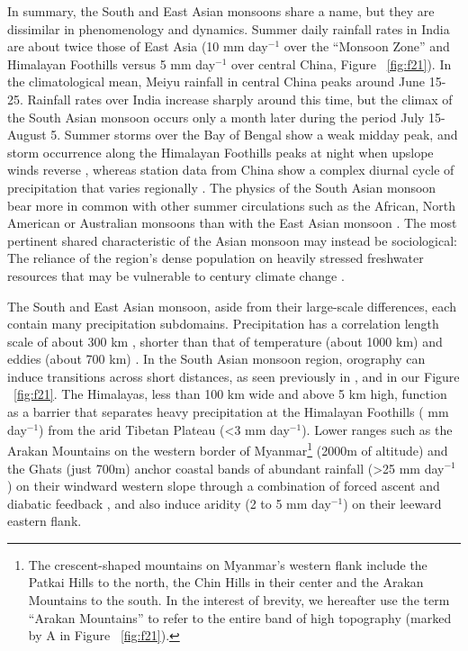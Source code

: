 	In summary, the South and East Asian monsoons share a name, but they are dissimilar in phenomenology and dynamics. Summer daily rainfall rates in India are about twice those of East Asia (10 mm day$^{-1}$ over the ``Monsoon Zone'' and Himalayan Foothills versus 5 mm day$^{-1}$ over central China, Figure ~\ref{fig:f21}). In the climatological mean, Meiyu rainfall in central China peaks around June 15-25. Rainfall rates over India increase sharply around this time, but the climax of the South Asian monsoon occurs only a month later during the period July 15-August 5. Summer storms over the Bay of Bengal show a weak midday peak, and storm occurrence along the Himalayan Foothills peaks at night when upslope winds reverse \citep{Romatschke2011a}, whereas station data from China show a complex diurnal cycle of precipitation that varies regionally \citep{Zhou2008}. The physics of the South Asian monsoon bear more in common with other summer circulations such as the African, North American or Australian monsoons than with the East Asian monsoon \citep{Rodwell2001}. The most pertinent shared characteristic of the Asian monsoon may instead be sociological: The reliance of the region's dense population on heavily stressed freshwater resources that may be vulnerable to  century climate change \citep{Gleeson2012,JimenezCisneros2014}. 
		
	The South and East Asian monsoon, aside from their large-scale differences, each contain many precipitation subdomains. Precipitation has a correlation length scale of about 300 km \citep{Dai1997}, shorter than that of temperature (about 1000 km) and eddies (about 700 km) \citep{Hansen1987,Barnes2012}. In the South Asian monsoon region, orography can induce transitions across short distances, as seen previously in \cite{Xie2006}, \cite{Biasutti2011} and in our Figure ~\ref{fig:f21}. The Himalayas, less than 100 km wide and above 5 km high, function as a barrier that separates heavy precipitation at the Himalayan Foothills ( mm day$^{-1}$) from the arid Tibetan Plateau (\textless 3 mm day$^{-1}$). Lower ranges such as the Arakan Mountains on the western border of Myanmar\footnote{The crescent-shaped mountains on Myanmar's western flank include the Patkai Hills to the north, the Chin Hills in their center and the Arakan Mountains to the south. In the interest of brevity, we hereafter use the term ``Arakan Mountains'' to refer to the entire band of high topography (marked by A in Figure ~\ref{fig:f21}).} (\mytilde2000m of altitude) and the Ghats (just \mytilde700m) anchor coastal bands of abundant rainfall (\textgreater25 mm day$^{-1}$) on their windward western slope through a combination of forced ascent and diabatic feedback \citep{Xie2006}, and also induce aridity (2 to 5 mm day$^{-1}$) on their leeward eastern flank. 
	
